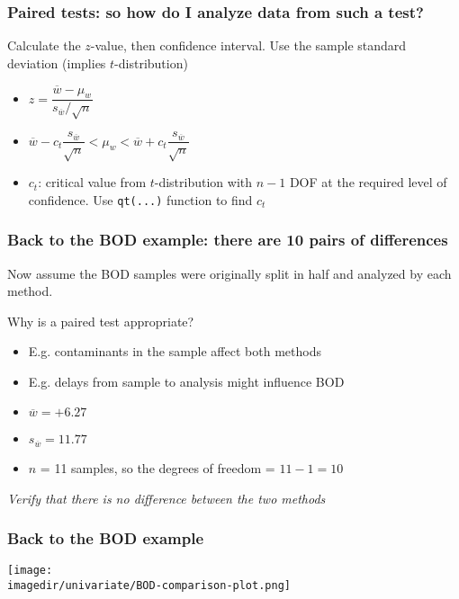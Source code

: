 \begin{frame}\frametitle{Paired tests: so how do I analyze data from such a test?}

	Calculate the $z$-value, then confidence interval. Use the sample standard deviation (implies $t$-distribution)
	\begin{itemize}
		\item	$z = \dfrac{\overline{w} - \mu_w}{s_{\overline{w}} / \sqrt{n}}$
	\end{itemize}
	\begin{itemize}
		\item	$\overline{w} - c_t \dfrac{s_{\overline{w}}}{\sqrt{n}} < \mu_w < \overline{w} + c_t \dfrac{s_{\overline{w}}}{\sqrt{n}}$
	\end{itemize}
	\begin{itemize}
		\item	$c_t$: critical value from $t$-distribution with $n-1$ DOF at the required level of confidence. Use \texttt{qt(...)} function to find $c_t$
	\end{itemize}
\end{frame}

\begin{frame}\frametitle{Back to the BOD example: there are 10 pairs of differences}

	Now assume the BOD samples were originally split in half and analyzed by each method.

	\vspace{12pt}
	Why is a paired test appropriate?
	\begin{itemize}
		\item	E.g. contaminants in the sample affect both methods
		\item	E.g. delays from sample to analysis might influence BOD
	\end{itemize}
	\begin{itemize}
		\item	$\overline{w} = +6.27$
		\item	$s_{\overline{w}} = 11.77$
		\item	$n$ = 11 samples, so the degrees of freedom = $11 - 1= 10$
	\end{itemize}

	\emph{Verify that there is no difference between the two methods}
\end{frame}

\begin{frame}\frametitle{Back to the BOD example}
	\begin{center}
		\texttt{[image: \\imagedir/univariate/BOD-comparison-plot.png]}
	\end{center}
\end{frame}

